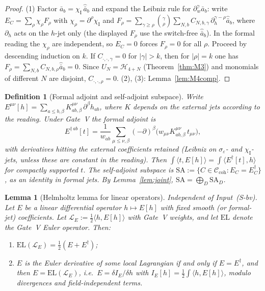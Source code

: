\documentclass{article}
\newtheorem{lemma}[proposition]{Lemma}
\newtheorem{definition}[proposition]{Definition}
\theoremstyle{remark}
\newcommand{\sigeps}{\sigma_\varepsilon}
\newcommand{\chiI}{\chi_{\mathrm I}}
\newcommand{\Ccoh}{\mathcal C_{\mathrm{coh}}}
\begin{document}
\begin{proof}
(1) Factor $\bar a_b=\chiI\,\hat{\bar a}_b$ and expand the Leibniz rule for $\partial_w^\gamma\bar a_b$:
write $E_C=\sum_\rho\chi_\rho F_\rho$ with $\chi_\rho=\partial^\rho\chiI$ and
$F_\rho=\sum_{\gamma\ge\rho}\binom{\gamma}{\rho}\sum_{N,b}C_{N,b,\gamma}\,\partial_h^{\gamma-\rho}\hat{\bar a}_b$, where $\partial_h$ acts on the $h$-jet only (the displayed $F_\rho$ use the switch-free $\hat{\bar a}_b$).
In the formal reading the $\chi_\rho$ are independent, so $E_C=0$ forces $F_\rho=0$ for all $\rho$.
Proceed by descending induction on $k$.
If $C_{\cdot,\cdot,\gamma}=0$ for $|\gamma|>k$, then for $|\rho|=k$ one has $F_\rho=\sum_{N,b}C_{N,b,\rho}\hat{\bar a}_b=0$.
Since $U_N=\mathcal H_{4+N}$ (Theorem~\ref{thm:M3}) and monomials of different $N$ are disjoint, $C_{\cdot,\cdot,\rho}=0$.
(2), (3): Lemma~\ref{lem:M4comp}.
\end{proof}

\begin{definition}[Formal adjoint and self-adjoint subspace]
\label{def:adjoint}
Write $E^{\mu\nu}[h]=\sum_{a\le b,\beta}K^{\mu\nu}_{ab,\beta}\,\partial^\beta h_{ab}$, where $K$ depends on the external jets according to the reading.
Under Gate~V the formal adjoint is
\[
E^{\dagger\,ab}[t]=\frac1{w_{ab}}\sum_{\mu\le\nu,\beta}(-\partial)^\beta\bigl(w_{\mu\nu}K^{\mu\nu}_{ab,\beta}\,t_{\mu\nu}\bigr),
\]
with derivatives hitting the external coefficients retained (Leibniz on $\sigeps$- and $\chiI$-jets, unless these are constant in the reading).
Then $\int\langle t,E[h]\rangle=\int\langle E^\dagger[t],h\rangle$ for compactly supported $t$.
The \emph{self-adjoint subspace} is $\mathrm{SA}:=\{C\in\Ccoh:E_C=E_C^\dagger\}$, as an identity in formal jets.
By Lemma~\ref{lem:joint}, $\mathrm{SA}=\bigoplus_D\mathrm{SA}_D$.
\end{definition}

\begin{lemma}[Helmholtz lemma for linear operators]
\label{lem:helm}
Independent of Input~(S-bv).
Let $E$ be a linear differential operator $h\mapsto E[h]$ with fixed smooth (or formal-jet) coefficients.
Let $\mathcal L_E:=\tfrac12\langle h,E[h]\rangle$ with Gate~V weights, and let $\mathrm{EL}$ denote the Gate~V Euler operator.
Then:
\begin{enumerate}
\item $\mathrm{EL}(\mathcal L_E)=\tfrac12(E+E^\dagger)$;
\item $E$ is the Euler derivative of \emph{some} local Lagrangian if and only if $E=E^\dagger$, and then $E=\mathrm{EL}(\mathcal L_E)$, i.e.\ $E=\delta I_E/\delta h$ with $I_E[h]=\tfrac12\int\langle h,E[h]\rangle$, modulo divergences and field-independent terms.
\end{enumerate}
\end{lemma}
\end{document}
